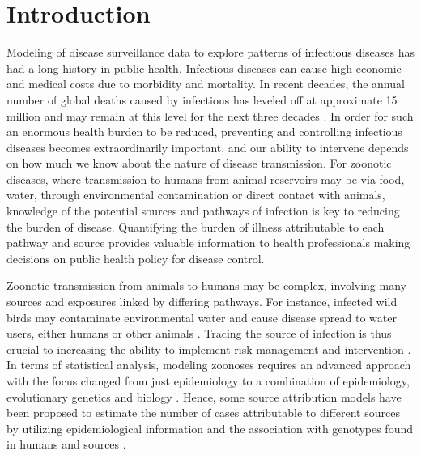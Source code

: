 \documentclass[AMA,STIX1COL]{WileyNJD-v2}
\begin{document}
\maketitle


\section{Introduction}
Modeling of disease surveillance data to explore patterns of infectious diseases has had a long history in public health. Infectious diseases can cause high economic and medical costs due to morbidity and mortality. In recent decades, the annual number of global deaths caused by infections has leveled off at approximate 15 million and may remain at this level for the next three decades \cite{DyeC, WHOM}. In order for such an enormous health burden to be reduced, preventing and controlling infectious diseases becomes extraordinarily important, and our ability to intervene depends on how much we know about the nature of disease transmission. For zoonotic diseases, where transmission to humans from animal reservoirs may be via food, water, through environmental contamination or direct contact with animals, knowledge of the potential sources and pathways of infection is key to reducing the burden of disease. Quantifying the burden of illness attributable to each pathway and source provides valuable information to health professionals making decisions on public health policy for disease control.

Zoonotic transmission from animals to humans may be complex, involving many sources and exposures linked by differing pathways. For instance, infected wild birds may contaminate environmental water and cause disease spread to water users, either humans or other animals \cite{Wagen}. Tracing the source of infection is thus crucial to increasing the ability to implement risk management and intervention \cite{Wilso, Morel}. In terms of statistical analysis, modeling zoonoses requires an advanced approach with the focus changed from just epidemiology to a combination of epidemiology, evolutionary genetics and biology \cite{Muell}. Hence, some source attribution models have been proposed to estimate the number of cases attributable to different sources by utilizing epidemiological information and the association with genotypes found in humans and sources \cite{vanP, Hald, MullA}.
\end{document}

